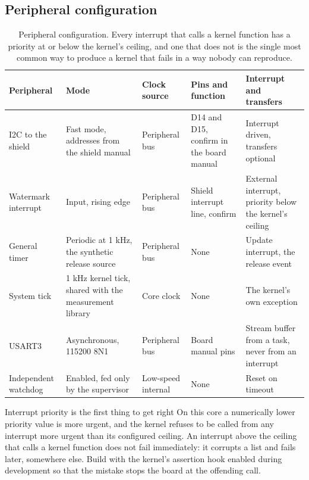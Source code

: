 \subsection*{Peripheral configuration}

\begin{table}[H]\centering\small
\begin{tabular}{p{22mm}p{26mm}p{24mm}p{30mm}p{30mm}}
\toprule
Peripheral & Mode & Clock source & Pins and function & Interrupt and transfers \\
\midrule
I2C to the shield & Fast mode, addresses from the shield manual & Peripheral bus & D14 and D15, confirm in the board manual & Interrupt driven, transfers optional \\
Watermark interrupt & Input, rising edge & Peripheral bus & Shield interrupt line, confirm & External interrupt, priority below the kernel's ceiling \\
General timer & Periodic at 1 kHz, the synthetic release source & Peripheral bus & None & Update interrupt, the release event \\
System tick & 1 kHz kernel tick, shared with the measurement library & Core clock & None & The kernel's own exception \\
USART3 & Asynchronous, 115200 8N1 & Peripheral bus & Board manual pins & Stream buffer from a task, never from an interrupt \\
Independent watchdog & Enabled, fed only by the supervisor & Low-speed internal & None & Reset on timeout \\
\bottomrule
\end{tabular}
\caption{Peripheral configuration. Every interrupt that calls a kernel function has a priority at or below the kernel's ceiling, and one that does not is the single most common way to produce a kernel that fails in a way nobody can reproduce.}
\end{table}

\begin{note}{Interrupt priority is the first thing to get right}
On this core a numerically lower priority value is more urgent, and the kernel
refuses to be called from any interrupt more urgent than its configured
ceiling. An interrupt above the ceiling that calls a kernel function does not
fail immediately: it corrupts a list and fails later, somewhere else. Build
with the kernel's assertion hook enabled during development so that the mistake
stops the board at the offending call.
\end{note}

